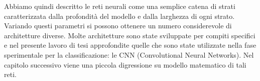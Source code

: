 Abbiamo quindi descritto le reti neurali come una semplice catena di strati caratterizzata
 dalla profondità del modello e dalla larghezza di ogni strato. Variando questi parametri 
 si possono ottenere un numero considerevole di architetture diverse. Molte architetture
  sono state sviluppate per compiti specifici e nel presente lavoro di tesi approfondite
   quelle che sono state utilizzate nella fase sperimentale per la classificazione:
    le CNN (Convolutional Neural Networks). 
Nel capitolo successivo viene una piccola digressione su modello matematico di tali reti.



